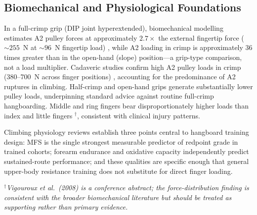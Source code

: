 \subsection{Biomechanical and Physiological Foundations}

In a full-crimp grip (DIP joint hyperextended), biomechanical modelling estimates A2 pulley forces at approximately $2.7\times$ the external fingertip force (${\sim}255$~N at ${\sim}96$~N fingertip load) \cite{VQLM06}, while A2 loading in crimp is approximately 36 times greater than in the open-hand (slope) position---a grip-type comparison, not a load multiplier. Cadaveric studies confirm high A2 pulley loads in crimp (380--700~N across finger positions) \cite{SCH01}, accounting for the predominance of A2 ruptures in climbing. Half-crimp and open-hand grips generate substantially lower pulley loads, underpinning standard advice against routine full-crimp hangboarding. Middle and ring fingers bear disproportionately higher loads than index and little fingers \cite{VQPC08}$^{\dagger}$, consistent with clinical injury patterns.

Climbing physiology reviews \cite{WAT04, MSBE07, FSSE16} establish three points central to hangboard training design: MFS is the single strongest measurable predictor of redpoint grade in trained cohorts; forearm endurance and oxidative capacity independently predict sustained-route performance; and these qualities are specific enough that general upper-body resistance training does not substitute for direct finger loading.

\smallskip
\noindent$^{\dagger}$\textit{Vigouroux et al.\ (2008) \cite{VQPC08} is a conference abstract; the force-distribution finding is consistent with the broader biomechanical literature but should be treated as supporting rather than primary evidence.}
